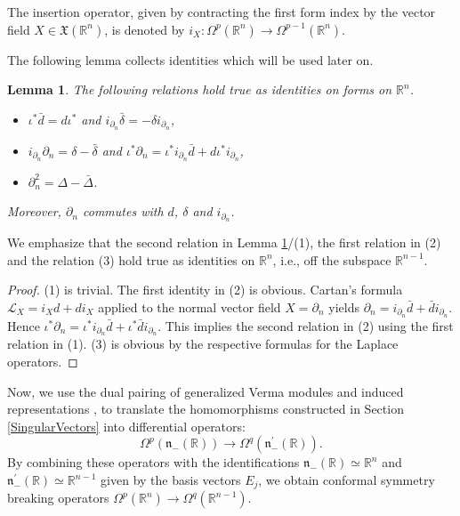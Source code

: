 \documentclass[a4paper,12pt,reqno]{amsart}
\newtheorem{lem}[theorem]{Lemma}
\numberwithin{theorem}{subsection}
\numberwithin{equation}{section}
\begin{document}
The insertion operator, given by contracting the first form index by the vector
field $X\in {{\mathfrak X}}({\mathbb{R}}^n)$, is denoted by $i_X:\Omega^p({\mathbb{R}}^n) \to
\Omega^{p-1}({\mathbb{R}}^n)$.

The following lemma collects identities which will be used later on.

\begin{lem}\label{DiffCoDiff} The following relations hold true as identities on forms on ${\mathbb{R}}^n$.
\begin{itemize}
   \item [(1)] $\iota^* \bar{d} = {d}\iota^*$ and $i_{\partial_n} \bar{\delta} = - \delta i_{\partial_n}$,
   \item [(2)] $i_{\partial_n}\partial_n = \delta - \bar{\delta}$ and
   $\iota^* \partial_n = \iota^* i_{\partial_n} \bar{d} + {d} \iota^* i_{\partial_n}$,
   \item [(3)] $\partial_n^2= \Delta - \bar{\Delta}$.
\end{itemize}
Moreover, $\partial_n$ commutes with ${d}$, $\delta$ and $i_{\partial_n}$.
\end{lem}

We emphasize that the second relation in Lemma \ref{DiffCoDiff}/(1), the first
relation in (2) and the relation (3) hold true as identities on ${\mathbb{R}}^n$, i.e.,
off the subspace ${\mathbb{R}}^{n-1}$.

\begin{proof} (1) is trivial. The first identity in (2) is obvious.
Cartan's formula ${\mathcal L}_X = i_X {d}+ {d} i_X$ applied to the normal vector field
$X = \partial_n$ yields $\partial_n = i_{\partial_n} \bar{d} + \bar{d}
i_{\partial_n}$. Hence $\iota^* \partial_n = \iota^* i_{\partial_n} \bar{d} +
\iota^* \bar{d} i_{\partial_n}$. This implies the second relation in (2)
using the first relation in (1). (3) is obvious by the respective formulas for
the Laplace operators.
\end{proof}

Now, we use the dual pairing of generalized Verma modules and induced
representations \cite{Kobayashi-Pevzner}, \cite{koss} to translate the
homomorphisms constructed in Section \ref{SingularVectors} into differential
operators:
$$
   \Omega^p({{\mathfrak n}}_-({\mathbb{R}})) \to \Omega^q({{\mathfrak n}}_-^\prime({\mathbb{R}})).
$$
By combining these operators with the identifications ${{\mathfrak n}}_-({\mathbb{R}}) \simeq {\mathbb{R}}^n$
and ${{\mathfrak n}}_-^\prime({\mathbb{R}}) \simeq {\mathbb{R}}^{n-1}$ given by the basis vectors $E_j$, we
obtain conformal symmetry breaking operators $\Omega^p({\mathbb{R}}^n) \to
\Omega^q({\mathbb{R}}^{n-1})$.
\end{document}
